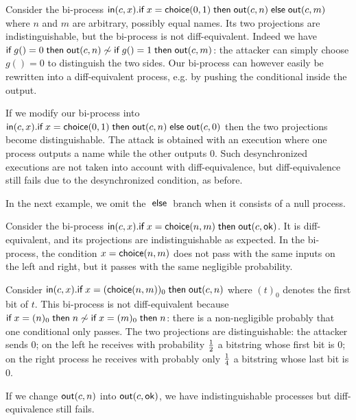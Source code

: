 \begin{example}
  Consider the bi-process
  $\mathsf{in}(c,x).\textsf{if}\; x=\mathsf{choice}(0,1) \;\textsf{then}\; \mathsf{out}(c,n) \;\textsf{else}\; \mathsf{out}(c,m)$
  where $n$ and $m$ are arbitrary, possibly equal names.
  Its two projections are indistinguishable, but the
  bi-process is not diff-equivalent.
  Indeed we have 
  $\textsf{if}\; g()=0 \;\textsf{then}\; \mathsf{out}(c,n) \not\sim
   \textsf{if}\; g()=1 \;\textsf{then}\; \mathsf{out}(c,m)$: the attacker can simply choose
  $g()=0$ to distinguish the two sides.
  Our bi-process can however easily be
  rewritten into a diff-equivalent process, e.g. by pushing the conditional
  inside the output.

  If we modify our bi-process into
  $\mathsf{in}(c,x).\textsf{if}\; x=\mathsf{choice}(0,1) \;\textsf{then}\; \mathsf{out}(c,n) \;\textsf{else}\; \mathsf{out}(c,0)$
  then the two projections become distinguishable.
  The attack is obtained with an execution
  where one process outputs a name while the other outputs $0$. Such
  desynchronized executions are not taken into account with diff-equivalence,
  but diff-equivalence still fails due to the desynchronized condition,
  as before.
\end{example}

\newcommand{\ok}{\mathsf{ok}}

In the next example, we omit the $\;\textsf{else}\;$ branch when it consists of a null 
process.

\begin{example} \label{ex:negl}
  Consider the bi-process
  $\In(c,x).\myif x=\diff{n}{m} \mythen \Out(c,\ok)$.
  It is diff-equivalent, and its projections are
  indistinguishable as expected.
  In the bi-process, the condition $x=\mathsf{choice}(n,m)$ does not pass
  with the same inputs on the left and right, but it passes with
  the same negligible probability.
\end{example}

\begin{example} \label{ex:sync}
  Consider
  $\mathsf{in}(c,x).\textsf{if}\; x=(\mathsf{choice}(n,m))_0 \;\textsf{then}\; \mathsf{out}(c,n)$
  where $(t)_0$ denotes the first bit of $t$.
  This bi-process is not diff-equivalent because
  $\textsf{if}\; x=(n)_0 \;\textsf{then}\; n \not\sim \textsf{if}\; x=(m)_0 \;\textsf{then}\; n$:
  there is a non-negligible probably that one conditional only passes.
  The two projections are distinguishable: the attacker sends $0$;
  on the left he receives with probability $1\over 2$ a bitstring whose
  first bit is $0$;
  on the right process he receives with probably only $1\over 4$
  a bitstring whose last bit is $0$.

  If we change $\mathsf{out}(c,n)$ into $\Out(c,\ok)$,
  we have indistinguishable processes but diff-equivalence still fails.
\end{example}

